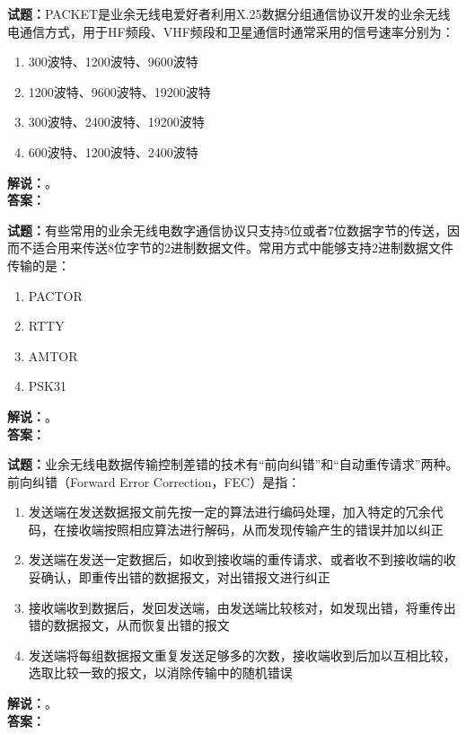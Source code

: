 \documentclass{ctexbook}
\begin{document}
\bigskip




\noindent\textbf{试题：}PACKET是业余无线电爱好者利用X.25数据分组通信协议开发的业余无线电通信方式，用于HF频段、VHF频段和卫星通信时通常采用的信号速率分别为：
\begin{enumerate}[leftmargin=3em]
\item 300波特、1200波特、9600波特
\item 1200波特、9600波特、19200波特
\item 300波特、2400波特、19200波特
\item 600波特、1200波特、2400波特
\end{enumerate}
\noindent\textbf{解说：}\textbf{}。\\\noindent\textbf{答案：}

\bigskip




\noindent\textbf{试题：}有些常用的业余无线电数字通信协议只支持5位或者7位数据字节的传送，因而不适合用来传送8位字节的2进制数据文件。常用方式中能够支持2进制数据文件传输的是：
\begin{enumerate}[leftmargin=3em]
\item PACTOR
\item RTTY
\item AMTOR
\item PSK31
\end{enumerate}
\noindent\textbf{解说：}\textbf{}。\\\noindent\textbf{答案：}

\bigskip




\noindent\textbf{试题：}业余无线电数据传输控制差错的技术有“前向纠错”和“自动重传请求”两种。前向纠错（Forward Error Correction，FEC）是指：
\begin{enumerate}[leftmargin=3em]
\item 发送端在发送数据报文前先按一定的算法进行编码处理，加入特定的冗余代码，在接收端按照相应算法进行解码，从而发现传输产生的错误并加以纠正
\item 发送端在发送一定数据后，如收到接收端的重传请求、或者收不到接收端的收妥确认，即重传出错的数据报文，对出错报文进行纠正
\item 接收端收到数据后，发回发送端，由发送端比较核对，如发现出错，将重传出错的数据报文，从而恢复出错的报文
\item 发送端将每组数据报文重复发送足够多的次数，接收端收到后加以互相比较，选取比较一致的报文，以消除传输中的随机错误
\end{enumerate}
\noindent\textbf{解说：}\textbf{}。\\\noindent\textbf{答案：}
\end{document}
